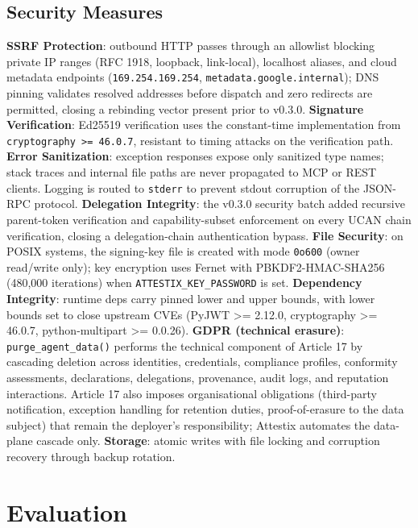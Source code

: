 \documentclass[conference]{IEEEtran}
\begin{document}
\subsection{Security Measures}
\label{sec:security-measures}

\textbf{SSRF Protection}: outbound HTTP passes through an allowlist blocking private IP ranges (RFC 1918, loopback, link-local), localhost aliases, and cloud metadata endpoints (\texttt{169.254.169.254}, \texttt{metadata.google.internal}); DNS pinning validates resolved addresses before dispatch and zero redirects are permitted, closing a rebinding vector present prior to v0.3.0.
\textbf{Signature Verification}: Ed25519 verification uses the constant-time implementation from \texttt{cryptography \textgreater= 46.0.7}, resistant to timing attacks on the verification path.
\textbf{Error Sanitization}: exception responses expose only sanitized type names; stack traces and internal file paths are never propagated to MCP or REST clients. Logging is routed to \texttt{stderr} to prevent stdout corruption of the JSON-RPC protocol.
\textbf{Delegation Integrity}: the v0.3.0 security batch added recursive parent-token verification and capability-subset enforcement on every UCAN chain verification, closing a delegation-chain authentication bypass.
\textbf{File Security}: on POSIX systems, the signing-key file is created with mode \texttt{0o600} (owner read/write only); key encryption uses Fernet with PBKDF2-HMAC-SHA256 (480,000 iterations) when \texttt{ATTESTIX\_KEY\_PASSWORD} is set.
\textbf{Dependency Integrity}: runtime deps carry pinned lower and upper bounds, with lower bounds set to close upstream CVEs (PyJWT \textgreater= 2.12.0, cryptography \textgreater= 46.0.7, python-multipart \textgreater= 0.0.26).
\textbf{GDPR (technical erasure)}: \texttt{purge\_agent\_data()} performs the technical component of Article 17 by cascading deletion across identities, credentials, compliance profiles, conformity assessments, declarations, delegations, provenance, audit logs, and reputation interactions. Article 17 also imposes organisational obligations (third-party notification, exception handling for retention duties, proof-of-erasure to the data subject) that remain the deployer's responsibility; Attestix automates the data-plane cascade only.
\textbf{Storage}: atomic writes with file locking and corruption recovery through backup rotation.

\section{Evaluation}
\label{sec:evaluation}
\end{document}
